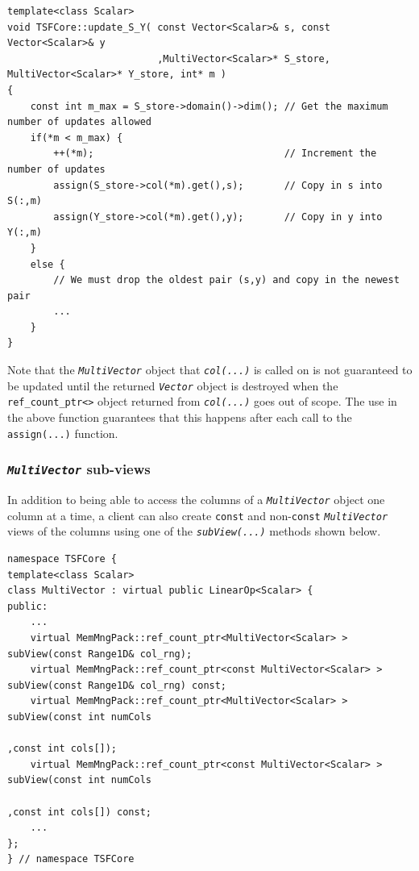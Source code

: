 {\scriptsize\begin{verbatim}
template<class Scalar>
void TSFCore::update_S_Y( const Vector<Scalar>& s, const Vector<Scalar>& y
                          ,MultiVector<Scalar>* S_store, MultiVector<Scalar>* Y_store, int* m )
{
    const int m_max = S_store->domain()->dim(); // Get the maximum number of updates allowed
    if(*m < m_max) {
        ++(*m);                                 // Increment the number of updates
        assign(S_store->col(*m).get(),s);       // Copy in s into S(:,m)         
        assign(Y_store->col(*m).get(),y);       // Copy in y into Y(:,m)
    }
    else {
        // We must drop the oldest pair (s,y) and copy in the newest pair
        ...
    }
}
\end{verbatim}}

\noindent Note that the \texttt{\textit{Multi\-Vector}} object that
\texttt{\textit{col(...)}} is called on is not guaranteed to be
updated until the returned \texttt{\textit{Vector}} object is
destroyed when the \texttt{ref\_count\_ptr<>} object returned from
\texttt{\textit{col(...)}} goes out of scope.  The use in the above function
guarantees that this happens after each call to the
\texttt{assign(...)} function.

%
\subsubsection{\texttt{\textit{Multi\-Vector}} sub-views}
%

In addition to being able to access the columns of a
\texttt{\textit{Multi\-Vector}} object one column at a time, a client
can also create \texttt{const} and non-\texttt{const}
\texttt{\textit{Multi\-Vector}} views of the columns
using one of the \texttt{\textit{subView(...)}} methods shown below.

{\scriptsize\begin{verbatim}
namespace TSFCore {
template<class Scalar>
class MultiVector : virtual public LinearOp<Scalar> {
public:
    ...
    virtual MemMngPack::ref_count_ptr<MultiVector<Scalar> >       subView(const Range1D& col_rng);
    virtual MemMngPack::ref_count_ptr<const MultiVector<Scalar> > subView(const Range1D& col_rng) const;
    virtual MemMngPack::ref_count_ptr<MultiVector<Scalar> >       subView(const int numCols
                                                                          ,const int cols[]);
    virtual MemMngPack::ref_count_ptr<const MultiVector<Scalar> > subView(const int numCols
                                                                          ,const int cols[]) const;
    ...
};
} // namespace TSFCore
\end{verbatim}}

